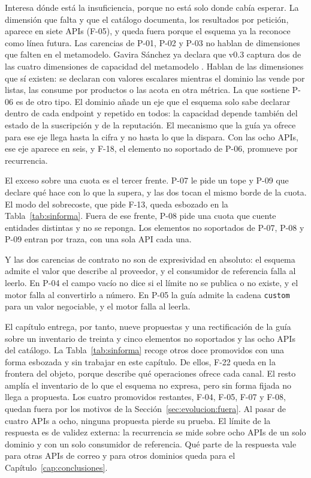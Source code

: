 Interesa dónde está la insuficiencia, porque no está solo donde cabía esperar.
La dimensión que falta y que el catálogo documenta, los resultados por petición, aparece en siete APIs (F-05), y queda fuera porque el esquema ya la reconoce como línea futura.
Las carencias de P-01, P-02 y P-03 no hablan de dimensiones que falten en el metamodelo.
Gavira Sánchez ya declara que v0.3 captura dos de las cuatro dimensiones de capacidad del metamodelo \citep{gavira2026tfm}.
Hablan de las dimensiones que sí existen: se declaran con valores escalares mientras el dominio las vende por listas, las consume por productos o las acota en otra métrica.
La que sostiene P-06 es de otro tipo.
El dominio añade un eje que el esquema solo sabe declarar dentro de cada endpoint y repetido en todos: la capacidad depende también del estado de la suscripción y de la reputación.
El mecanismo que la guía ya ofrece para ese eje llega hasta la cifra y no hasta lo que la dispara.
Con las ocho APIs, ese eje aparece en seis, y F-18, el elemento no soportado de P-06, promueve por recurrencia.

El exceso sobre una cuota es el tercer frente.
P-07 le pide un tope y P-09 que declare qué hace con lo que la supera, y las dos tocan el mismo borde de la cuota.
El modo del sobrecoste, que pide F-13, queda esbozado en la Tabla~\ref{tab:sinforma}.
Fuera de ese frente, P-08 pide una cuota que cuente entidades distintas y no se reponga.
Los elementos no soportados de P-07, P-08 y P-09 entran por traza, con una sola API cada una.

Y las dos carencias de contrato no son de expresividad en absoluto: el esquema admite el valor que describe al proveedor, y el consumidor de referencia falla al leerlo.
En P-04 el campo vacío no dice si el límite no se publica o no existe, y el motor falla al convertirlo a número.
En P-05 la guía admite la cadena \texttt{custom} para un valor negociable, y el motor falla al leerla.

El capítulo entrega, por tanto, nueve propuestas y una rectificación de la guía sobre un inventario de treinta y cinco elementos no soportados y las ocho APIs del catálogo.
La Tabla~\ref{tab:sinforma} recoge otros doce promovidos con una forma esbozada y sin trabajar en este capítulo.
De ellos, F-22 queda en la frontera del objeto, porque describe qué operaciones ofrece cada canal.
El resto amplía el inventario de lo que el esquema no expresa, pero sin forma fijada no llega a propuesta.
Los cuatro promovidos restantes, F-04, F-05, F-07 y F-08, quedan fuera por los motivos de la Sección~\ref{sec:evolucion:fuera}.
Al pasar de cuatro APIs a ocho, ninguna propuesta pierde su prueba.
El límite de la respuesta es de validez externa: la recurrencia se mide sobre ocho APIs de un solo dominio y con un solo consumidor de referencia.
Qué parte de la respuesta vale para otras APIs de correo y para otros dominios queda para el Capítulo~\ref{cap:conclusiones}.
